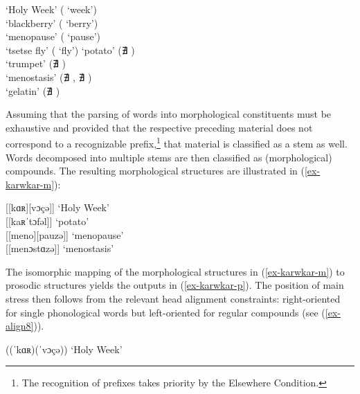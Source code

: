 \documentclass[output=paper
 ,nobabel
 ,draftmode
 ,colorlinks, citecolor=brown
]{langscibook}
\begin{document}
\eal
\ex\label{ex-karwoche}
 `Holy Week' ( `week')\\
 `blackberry'  ( `berry')\\
 `menopause'  ( `pause')\\
 `tsetse fly'  ( `fly') 
\ex\label{ex-kartoffel} 
 `potato'  (∄ ) \\
 `trumpet'  (∄ ) \\
 `menostasis'  (∄ , ∄ ) \\
 `gelatin'  (∄ ) 
\zl

\noindent
Assuming that the parsing of words into morphological constituents must be exhaustive and provided that the
respective preceding material does not correspond to a recognizable prefix,\footnote{
The recognition of prefixes takes priority by the Elsewhere Condition.
} that material is
classified as a stem as well. Words decomposed into multiple stems are then classified as
(morphological) compounds. The resulting morphological structures are illustrated in
(\ref{ex-karwkar-m}):  

\eal\label{ex-karwkar-m}
\ex\label{ex-karwoche-m}
{[[kɑʀ][vɔçə]]}  `Holy Week'\\

\ex\label{ex-kartoffel-m}
{[[kaʀˈtɔfəl]]}  `potato'\\

\ex\label{ex-menopause-m}
{[[meno][pauzə]]}  `menopause'\\

\ex\label{ex-menostase-m}
{[[menɔstɑzə]]}  `menostasis'\\

\zl

\noindent
The isomorphic mapping of the morphological structures in (\ref{ex-karwkar-m}) to prosodic structures yields the outputs in (\ref{ex-karwkar-p}). The position of main stress then follows from the relevant head alignment constraints: right-oriented for single phonological words but left-oriented for regular compounds (see (\ref{ex-align8})).

\eal\label{ex-karwkar-p}
\ex\label{ex-karwoche-p}
((ˈkɑʀ)(ˈvɔçə))  `Holy Week'\\
\end{document}
